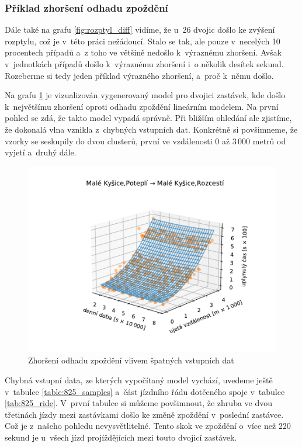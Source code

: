 \subsubsection{Příklad zhoršení odhadu zpoždění}

Dále také na grafu \ref{fig:rozptyl_diff} vidíme, že u~26 dvojic došlo ke zvýšení rozptylu, což je v~této práci nežádoucí. Stalo se tak, ale pouze v~necelých 10 procentech případů a~z toho ve většině nedošlo k~výraznému zhoršení. Avšak v~jednotkách případů došlo k~výraznému zhoršení i~o několik desítek sekund. Rozeberme si tedy jeden příklad výrazného zhoršení, a~proč k~němu došlo.


\bigbreak

Na grafu \ref{fig:chyba} je vizualizován vygenerovaný model pro dvojici zastávek, kde došlo k~největšímu zhoršení oproti odhadu zpoždění lineárním modelem. Na první pohled se zdá, že takto model vypadá správně. Při bližším ohledání ale zjistíme, že dokonalá vlna vznikla z~chybných vstupních dat. Konkrétně si povšimneme, že vzorky se seskupily do dvou clusterů, první ve vzdálenosti 0 až 3\,000 metrů od vyjetí a~druhý dále.


\begin{figure}
   \centering
 \includegraphics[width=1\linewidth]{../img/808_809}
 \caption{Zhoršení odhadu zpoždění vlivem špatných vstupních dat}
 \label{fig:chyba}
\end{figure}

\bigbreak


Chybná vstupní data, ze kterých vypočítaný model vychází, uvedeme ještě v~tabulce \ref{table:825_samples} a~část jízdního řádu dotčeného spoje v~tabulce \ref{tab:825_ride}. V~první tabulce si můžeme povšimnout, že zhruba ve dvou třetinách jízdy mezi zastávkami došlo ke změně zpoždění v~poslední zastávce. Což je z~našeho pohledu nevysvětlitelné. Tento skok ve zpoždění o~více než 220 sekund je u~všech jízd projíždějících mezi touto dvojicí zastávek.

